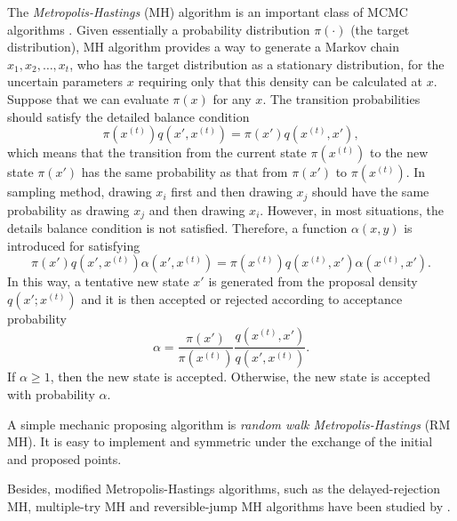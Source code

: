 The \textit{Metropolis-Hastings} (MH) algorithm is an important class of MCMC algorithms \citep{smith1993bayesian, tierney1994markov, gilks1995markov}. Given essentially a probability distribution $\pi(\cdot)$ (the target distribution), MH algorithm provides a way to generate a Markov chain $x_1, x_2,\ldots, x_t$, who has the target distribution as a stationary distribution, for the uncertain parameters $x$ requiring only that this density can be calculated at $x$. Suppose that we can evaluate $\pi(x)$ for any $x$. The transition probabilities should satisfy the detailed balance condition
\begin{equation}
\pi\left(x^{(t)}\right)q\left(x', x^{(t)}\right) = \pi\left(x'\right)q\left(x^{(t)}, x'\right),
\end{equation}
which means that the transition from the current state $\pi\left(x^{\left(t\right)}\right)$ to the new state $\pi\left(x'\right)$ has the same probability as that 
from $\pi\left(x'\right)$ to $\pi\left(x^{\left(t\right)}\right)$. In sampling method, drawing $x_i$ first and then drawing $x_j$ should have the same probability as drawing $x_j$ and then drawing $x_i$. However, in most situations, the details balance condition is not satisfied. Therefore, a function $\alpha\left(x,y\right)$ is introduced for satisfying 
\begin{equation}
\pi\left(x'\right)q\left(x', x^{\left(t\right)}\right)\alpha\left(x',x^{\left(t\right)}\right) = \pi\left(x^{\left(t\right)}\right)q\left(x^{\left(t\right)}, x'\right)\alpha\left(x^{\left(t\right)},x'\right).
\end{equation}
In this way, a tentative new state $x'$ is generated from the proposal density $q\left(x';x^{\left(t\right)}\right)$ and it is then accepted or rejected according to acceptance probability 
\begin{equation}\label{IntroAccp}
\alpha=\frac{\pi\left(x'\right)}{\pi\left(x^{\left(t\right)}\right)}\frac{q\left(x^{\left(t\right)}, x'\right)}{q\left(x', x^{\left(t\right)}\right)}.
\end{equation}
If $\alpha \geq 1$, then the new state is accepted. Otherwise, the new state is accepted with probability $\alpha$.

A simple mechanic proposing algorithm is \textit{random walk Metropolis-Hastings} (RM MH). It is easy to implement and symmetric under the exchange of the initial and proposed points. 

Besides, modified Metropolis-Hastings algorithms, such as the delayed-rejection MH, multiple-try MH and reversible-jump MH algorithms have been studied by \cite{tierney1999some, liu2000multiple, green1995reversible}. 
 

